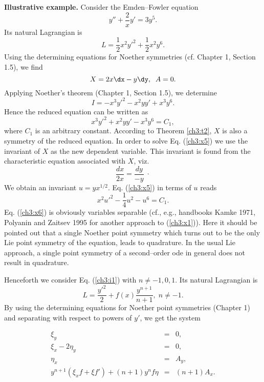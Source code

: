 {\bf Illustrative example.} Consider the Emden--Fowler equation
\begin{equation}
\label{ch3:x1}
y''+\frac{2}{x}y'=3y^5 .
\end{equation}
Its natural Lagrangian is
\begin{equation}
\label{ch3:x2}
L=\frac{1}{2}x^2y'^2+\frac{1}{2}x^2y^6.
\end{equation}
Using the determining equations for Noether symmetries
(cf. Chapter 1, Section 1.5), we find
\begin{equation}
\label{ch3:x3}
X=2x\dx-y\dy,\;\;A=0.
\end{equation}
Applying Noether's theorem (Chapter 1, Section 1.5), we determine
\begin{equation}
\label{ch3:x4}
I=-x^3y'^2-x^2yy'+x^3y^6.
\end{equation}
Hence the reduced equation can be written as
\begin{equation}
\label{ch3:x5}
x^3y'^2+x^2yy'-x^3y^6=C_1,
\end{equation}
where $C_1$ is an arbitrary constant. According to Theorem \ref{ch3:t2}, $X$
is also a symmetry of the reduced equation. In order to solve Eq.
(\ref{ch3:x5}) we use the invariant of $X$ as the new dependent variable. This
invariant is found from the characteristic equation associated with $X$,
viz.
\[\frac{dx}{2x}=\frac{dy}{-y}\;\cdot\]
We obtain an invariant $u=yx^{1/2}$.
Eq. (\ref{ch3:x5}) in terms of $u$ reads
\begin{equation} \label{ch3:x6}
x^2u'^2-\frac{1}{4}u^2-u^6=C_1.
\end{equation}
Eq. (\ref{ch3:x6}) is obviously variables separable
(cf., e.g., handbooks Kamke 1971, Polyanin and Zaitsev 1995 for another
approach to (\ref{ch3:x1})).
Here it should be pointed out that a single
Noether point symmetry which turns out to be the only Lie point symmetry
of the equation, leads to quadrature. In the usual Lie approach, a single 
point symmetry of a second--order ode in general does not result
in quadrature.

Henceforth we consider Eq. (\ref{ch3:i1})
with $n\ne -1, 0, 1$.
Its natural Lagrangian is
\begin{equation}
L=\frac{y'^2}{2}+f(x)\frac{y^{n+1}}{n+1}, \; n\ne -1 . \label{ch3:n8}
\end{equation}
By using the determining equations for Noether point symmetries
(Chapter 1) and separating with respect to powers of $y'$,
we get the system

\begin{eqnarray} \xi_y & =& 0, \label{ch3:n9}\\
\xi_x-2\eta_y &=& 0,
\label{ch3:n10}\\
\eta_x &= & A_y , \label{ch3:n11} \\ y^{n+1}\left (\xi_x f+\xi
f'\right )+(n+1)y^n f\eta & =& (n+1)A_x . \label{ch3:n12}
\end{eqnarray}

